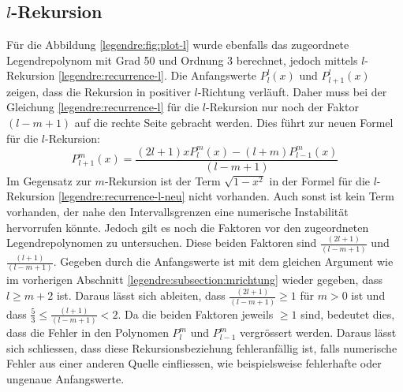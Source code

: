 \subsection{$l$-Rekursion
\label{legendre:subsection:lrichtung}}
Für die Abbildung \ref{legendre:fig:plot-l} wurde ebenfalls das zugeordnete Legendrepolynom mit Grad 50 und Ordnung 3 berechnet, jedoch mittels $l$-Rekursion \eqref{legendre:recurrence-l}.
Die Anfangswerte $P^{l}_{l}(x)$ und $P^{l}_{l+1}(x)$ zeigen, dass die Rekursion in positiver $l$-Richtung verläuft.
Daher muss bei der Gleichung \eqref{legendre:recurrence-l} für die $l$-Rekursion nur noch der Faktor $(l-m+1)$ auf die rechte Seite gebracht werden.
Dies führt zur neuen Formel für die $l$-Rekursion: 
\begin{equation}
P^{m}_{l+1}(x)
= \frac{(2l+1)xP^{m}_{l}(x)-(l+m)P^{m}_{l-1}(x)}{(l-m+1)} 
\label{legendre:recurrence-l-neu}
\end{equation}
Im Gegensatz zur $m$-Rekursion ist der Term $\sqrt{1-x^2}$ in der Formel für die $l$-Rekursion \eqref{legendre:recurrence-l-neu} nicht vorhanden.
Auch sonst ist kein Term vorhanden, der nahe den Intervallsgrenzen eine numerische Instabilität hervorrufen könnte.
Jedoch gilt es noch die Faktoren vor den zugeordneten Legendrepolynomen zu untersuchen.
Diese beiden Faktoren sind $\frac{(2l+1)}{(l-m+1)}$ und $\frac{(l+1)}{(l-m+1)}$.
Gegeben durch die Anfangswerte ist mit dem gleichen Argument wie im vorherigen Abschnitt \ref{legendre:subsection:mrichtung} wieder gegeben, dass $l\geq m+2$ ist.
Daraus lässt sich ableiten, dass $\frac{(2l+1)}{(l-m+1)}\geq 1$ für $m>0$ ist und dass $\frac{5}{3}\leq \frac{(l+1)}{(l-m+1)}<2$.
Da die beiden Faktoren jeweils $\geq 1$ sind, bedeutet dies, dass die Fehler in den Polynomen $P^{m}_{l}$ und $P^{m}_{l-1}$ vergrössert werden.
Daraus lässt sich schliessen, dass diese Rekursionsbeziehung fehleranfällig ist, falls numerische Fehler aus einer anderen Quelle einfliessen, wie beispielsweise fehlerhafte oder ungenaue Anfangswerte.


